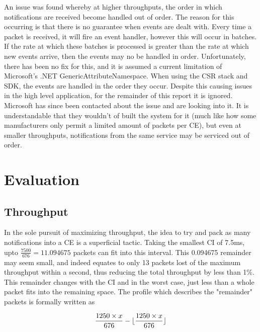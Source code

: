\documentclass[]{article}
\DeclarePairedDelimiter\floor{\lfloor}{\rfloor}
\begin{document}
An issue was found whereby at higher throughputs, the order in which notifications are received become handled out of order. The reason for this occurring is that there is no guarantee when events are dealt with. Every time a packet is received, it will fire an event handler, however this will occur in batches. If the rate at which these batches is processed is greater than the rate at which new events arrive, then the events may no be handled in order. Unfortunately, there has been no fix for this, and it is assumed a current limitation of Microsoft's .NET GenericAttributeNamespace. When using the \ac{CSR} stack and \ac{SDK}, the events are handled in the order they occur. Despite this causing issues in the high level application, for the remainder of this report it is ignored. Microsoft has since been contacted about the issue and are looking into it. It is understandable that they wouldn't of built the system for it (much like how some manufacturers only permit a limited amount of packets per \ac{CE}), but even at smaller throughputs, notifications from the same service may be serviced out of order. 





\clearpage



\clearpage
\section{Evaluation}

\subsection{Throughput}
\label{sec:Throughput}

In the sole pursuit of maximizing throughput, the idea to try and pack as many notifications into a \ac{CE} is a superficial tactic. Taking the smallest \ac{CI} of 7.5ms, upto $\frac{7500}{676} = 11.094675$ packets can fit into this interval. This 0.094675 remainder may seem small, and indeed equates to only 13 packets lost of the maximum throughput within a second, thus reducing the total throughput by less than 1$\%$. This remainder changes with the \ac{CI} and in the worst case, just less than a whole packet fits into the remaining space. The profile which describes the "remainder" packets is formally written as

\begin{displaymath}
 \frac{1250\times x}{676}  - \floor{ \frac{1250\times x}{676}}
\end{displaymath}
\end{document}
